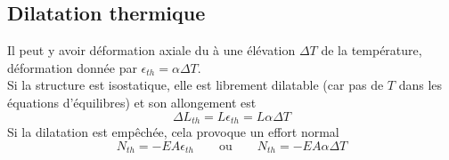 	\subsection{Dilatation thermique}
	Il peut y avoir déformation axiale du à une élévation $\Delta T$ de la 
	température, déformation donnée par $\epsilon_{th} = \alpha\Delta T$. \\
	Si la structure est isostatique, elle est librement dilatable (car pas de 
	$T$ dans les équations d'équilibres) et son allongement est 
	\begin{equation}
	\Delta L_{th} = L\epsilon_{th} = L\alpha\Delta T
	\end{equation}
	Si la dilatation est empêchée, cela provoque un effort normal
	\begin{equation}
	N_{th} = -EA\epsilon_{th}\qquad\text{ou}\qquad N_{th} = -EA\alpha \Delta T
	\end{equation}
